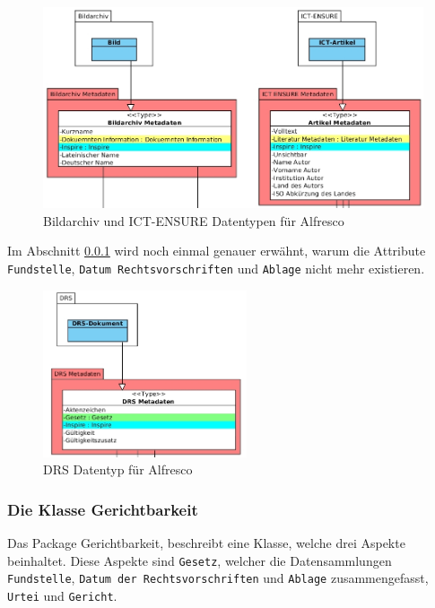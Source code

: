 \begin{figure}[!ht]
\centering
\includegraphics[width=12cm]{Bilder/AlfrescoModell/Bildarchiv-und-ICT-Datentypen.jpg}
\caption{Bildarchiv und ICT-ENSURE Datentypen f\"ur Alfresco}
\label{Bildarchiv und ICT-ENSURE Datentypen f\"ur Alfresco}
\centering
\end{figure}

Im Abschnitt \ref{Die Klasse Gerichtbarkeit} wird noch einmal genauer erw\"ahnt, warum die Attribute \texttt{Fundstelle}, \texttt{Datum Rechtsvorschriften} und \texttt{Ablage} nicht mehr existieren.

\begin{figure}[!ht]
\centering
\includegraphics[width=6cm]{Bilder/AlfrescoModell/DRS-Datentypen.jpg}
\caption{DRS Datentyp f\"ur Alfresco}
\label{DRS Datentyp f\"ur Alfresco}
\centering
\end{figure}

\subsubsection{Die Klasse Gerichtbarkeit}\label{Die Klasse Gerichtbarkeit}
Das Package Gerichtbarkeit, beschreibt eine Klasse, welche drei Aspekte beinhaltet. Diese Aspekte sind \texttt{Gesetz}, welcher die Datensammlungen \texttt{Fundstelle}, \texttt{Datum der Rechtsvorschriften} und \texttt{Ablage} zusammengefasst, \texttt{Urtei} und \texttt{Gericht}. 

